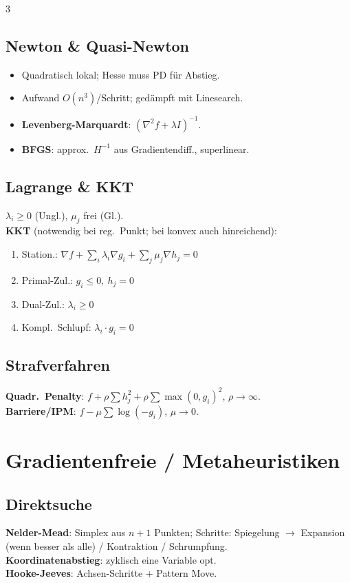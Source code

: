 \documentclass[8pt,a4paper]{extarticle}
\begin{document}
\begin{multicols*}{3}
\subsection{Newton \& Quasi-Newton}
\begin{itemize}
\item Quadratisch lokal; Hesse muss PD f\"ur Abstieg.
\item Aufwand $O(n^3)$/Schritt; ged\"ampft mit Linesearch.
\item \textbf{Levenberg-Marquardt}: $(\nabla^2 f+\lambda I)^{-1}$.
\item \textbf{BFGS}: approx.\ $H^{-1}$ aus Gradientendiff., superlinear.
\end{itemize}

\subsection{Lagrange \& KKT}
$\lambda_i\ge 0$ (Ungl.), $\mu_j$ frei (Gl.).\\[0.3ex]
\textbf{KKT} (notwendig bei reg.\ Punkt; bei konvex auch hinreichend):
\begin{enumerate}
\item Station.: $\nabla f+\sum_i\lambda_i\nabla g_i+\sum_j\mu_j\nabla h_j=0$
\item Primal-Zul.: $g_i\le 0,\ h_j=0$
\item Dual-Zul.: $\lambda_i\ge 0$
\item Kompl.\ Schlupf: $\lambda_i\cdot g_i=0$
\end{enumerate}

\subsection{Strafverfahren}
\textbf{Quadr.\ Penalty}: $f+\rho\sum h_j^2+\rho\sum\max(0,g_i)^2$, $\rho\!\to\!\infty$.\\
\textbf{Barriere/IPM}: $f-\mu\sum\log(-g_i)$, $\mu\!\to\!0$.

\section{Gradientenfreie / Metaheuristiken}
\subsection{Direktsuche}
\textbf{Nelder-Mead}: Simplex aus $n{+}1$ Punkten; Schritte: Spiegelung $\to$ Expansion (wenn besser als alle) / Kontraktion / Schrumpfung.\\
\textbf{Koordinatenabstieg}: zyklisch eine Variable opt.\\
\textbf{Hooke-Jeeves}: Achsen-Schritte + Pattern Move.


\end{multicols*}
\end{document}
